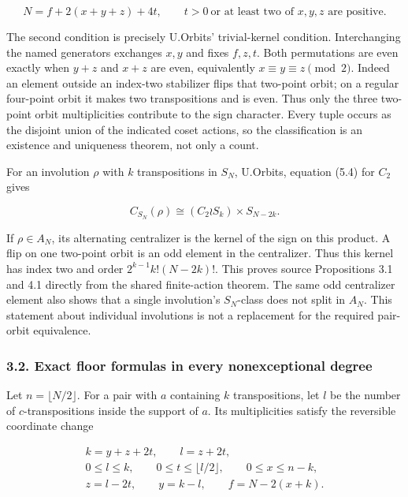 \documentclass[
  11pt,
  a4paper,
]{article}
\newcounter{none} %
\begin{document}
\[
 N=f+2(x+y+z)+4t,\qquad
 t>0\ \text{or at least two of }x,y,z\text{ are positive}.
 \tag{CPI1}
\]

The second condition is precisely U.Orbits' trivial-kernel condition.
Interchanging the named generators exchanges \(x,y\) and fixes
\(f,z,t\). Both permutations are even exactly when \(y+z\) and \(x+z\)
are even, equivalently \(x\equiv y\equiv z\pmod2\). Indeed an element
outside an index-two stabilizer flips that two-point orbit; on a regular
four-point orbit it makes two transpositions and is even. Thus only the
three two-point orbit multiplicities contribute to the sign character.
Every tuple occurs as the disjoint union of the indicated coset actions,
so the classification is an existence and uniqueness theorem, not only a
count.

For an involution \(\rho\) with \(k\) transpositions in \(S_N\),
U.Orbits, equation (5.4) for \(C_2\) gives

\[
 C_{S_N}(\rho)\cong(C_2\wr S_k)\times S_{N-2k}.
 \tag{CPI2}
\]

If \(\rho\in A_N\), its alternating centralizer is the kernel of the
sign on this product. A flip on one two-point orbit is an odd element in
the centralizer. Thus this kernel has index two and order
\(2^{k-1}k!(N-2k)!\). This proves source Propositions 3.1 and 4.1
directly from the shared finite-action theorem. The same odd centralizer
element also shows that a single involution's \(S_N\)-class does not
split in \(A_N\). This statement about individual involutions is not a
replacement for the required pair-orbit equivalence.

\subsubsection{3.2. Exact floor formulas in every nonexceptional
degree}\label{exact-floor-formulas-in-every-nonexceptional-degree}

Let \(n=\lfloor N/2\rfloor\). For a pair with \(a\) containing \(k\)
transpositions, let \(l\) be the number of \(c\)-transpositions inside
the support of \(a\). Its multiplicities satisfy the reversible
coordinate change

\[
 \begin{gathered}
 k=y+z+2t,\qquad l=z+2t,\\
 0\le l\le k,\qquad 0\le t\le\lfloor l/2\rfloor,\qquad0\le x\le n-k,\\
 z=l-2t,\qquad y=k-l,\qquad f=N-2(x+k).
 \end{gathered}
 \tag{CPI3}
\]
\end{document}
